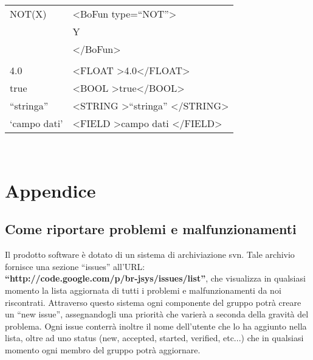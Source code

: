 \begin{table}[htbp]
\begin{tabular}{||p{3cm}||p{6.5cm}||}
\hline
NOT(X) & \textless BoFun type=``NOT''\textgreater \\
&  Y \\
& \textless /BoFun\textgreater \\ \hline
& \\ \hline 
4.0 & \textless FLOAT \textgreater4.0\textless /FLOAT\textgreater \\ \hline
true & \textless BOOL \textgreater true\textless /BOOL\textgreater \\ \hline
``stringa'' & \textless STRING \textgreater ``stringa'' \textless /STRING\textgreater \\ \hline
`campo dati' &\textless FIELD \textgreater campo dati \textless /FIELD\textgreater \\ \hline
\end{tabular} \\
\end{table}




\chapter{Appendice}
\section{Come riportare problemi e malfunzionamenti}
Il prodotto software \`e dotato di un sistema di archiviazione svn. Tale archivio fornisce una sezione ``issues'' all'URL: \\ 
\textbf{``http://code.google.com/p/br-jsys/issues/list''}, che visualizza in qualsiasi momento la lista aggiornata di tutti i problemi e malfunzionamenti da noi riscontrati. Attraverso questo sistema ogni componente del gruppo potr\`a creare un ``new issue'', assegnandogli una priorit\`a che varier\`a a seconda della gravit\`a del problema. Ogni issue conterr\`a inoltre il nome dell'utente che lo ha aggiunto nella lista, oltre ad uno status (new, accepted, started, verified, etc...) che in qualsiasi momento ogni membro del gruppo potr\`a aggiornare. 


